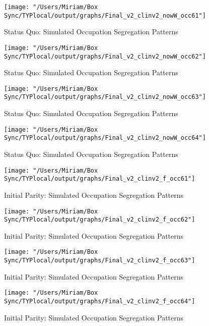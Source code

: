 \documentclass[11pt]{article}
\begin{document}
\begin{center}
\begin{figure}[H]
\centering
\caption{Status Quo: Simulated Occupation Segregation Patterns}
\label{fig:sq1}
\texttt{[image: "/Users/Miriam/Box Sync/TYPlocal/output/graphs/Final\_v2\_clinv2\_nowW\_occ61"]}
\end{figure}
\begin{figure}[H]
\centering
\caption{Status Quo: Simulated Occupation Segregation Patterns}
\label{fig:sq2}
\texttt{[image: "/Users/Miriam/Box Sync/TYPlocal/output/graphs/Final\_v2\_clinv2\_nowW\_occ62"]}
\end{figure}
\begin{figure}[H]
\centering
\caption{Status Quo: Simulated Occupation Segregation Patterns}
\label{fig:sq3}
\texttt{[image: "/Users/Miriam/Box Sync/TYPlocal/output/graphs/Final\_v2\_clinv2\_nowW\_occ63"]}
\end{figure}
\begin{figure}[H]
\centering
\caption{Status Quo: Simulated Occupation Segregation Patterns}
\label{fig:sq4}
\texttt{[image: "/Users/Miriam/Box Sync/TYPlocal/output/graphs/Final\_v2\_clinv2\_nowW\_occ64"]}
\end{figure}
\end{center}

\begin{center}
\begin{figure}[H]
\centering
\caption{Initial Parity: Simulated Occupation Segregation Patterns}
\label{fig:ip1}
\texttt{[image: "/Users/Miriam/Box Sync/TYPlocal/output/graphs/Final\_v2\_clinv2\_f\_occ61"]}
\end{figure}
\begin{figure}[H]
\centering
\caption{Initial Parity: Simulated Occupation Segregation Patterns}
\label{fig:ip2}
\texttt{[image: "/Users/Miriam/Box Sync/TYPlocal/output/graphs/Final\_v2\_clinv2\_f\_occ62"]}
\end{figure}
\begin{figure}[H]
\centering
\caption{Initial Parity: Simulated Occupation Segregation Patterns}
\label{fig:ip3}
\texttt{[image: "/Users/Miriam/Box Sync/TYPlocal/output/graphs/Final\_v2\_clinv2\_f\_occ63"]}
\end{figure}
\begin{figure}[H]
\centering
\caption{Initial Parity: Simulated Occupation Segregation Patterns}
\label{fig:ip4}
\texttt{[image: "/Users/Miriam/Box Sync/TYPlocal/output/graphs/Final\_v2\_clinv2\_f\_occ64"]}
\end{figure}
\end{center}
\end{document}
